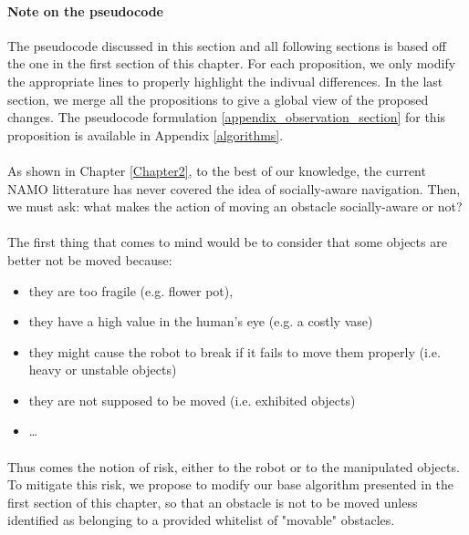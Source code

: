 \paragraph{Note on the pseudocode} The pseudocode discussed in this section and all following sections is based off the one in the first section of this chapter. For each proposition, we only modify the appropriate lines to properly highlight the indivual differences. In the last section, we merge all the propositions to give a global view of the proposed changes. The pseudocode formulation \ref{appendix_observation_section} for this proposition is available in Appendix \ref{algorithms}.

\paragraph{} As shown in Chapter \ref{Chapter2}, to the best of our knowledge, the current NAMO litterature has never covered the idea of socially-aware navigation. Then, we must ask: what makes the action of moving an obstacle socially-aware or not?

\paragraph{} The first thing that comes to mind would be to consider that some objects are better not be moved because:

\begin{itemize}
  \item they are too fragile (e.g. flower pot),
  \item they have a high value in the human’s eye (e.g. a costly vase)
  \item they might cause the robot to break if it fails to move them properly (i.e. heavy or unstable objects)
  \item they are not supposed to be moved (i.e. exhibited objects)
  \item \dots
\end{itemize}

\paragraph{} Thus comes the notion of risk, either to the robot or to the manipulated objects. To mitigate this risk, we propose to modify our base algorithm presented in the first section of this chapter, so that an obstacle is not to be moved unless identified as belonging to a provided whitelist of "movable" obstacles.

